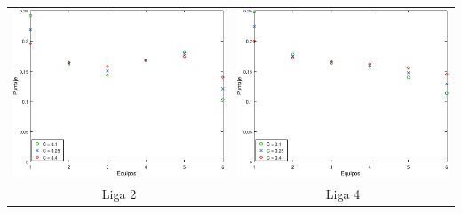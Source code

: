             \noindent{} \begin{minipage}{\textwidth}
                \begin{center}
                    \vspace{1em}

                    \begin{tabular}{cc}
                        \includegraphics{graficos/exp3-partidos-liga2-C.pdf} & \includegraphics{graficos/exp3-partidos-liga4-C} \\
                        {\small Liga 2}                                      & {\small Liga 4}
                    \end{tabular}
                \end{center}
            \end{minipage}

